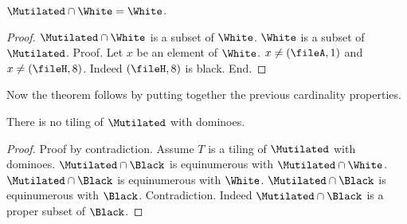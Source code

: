 \begin{forthel}
    \begin{lemma}
        $\Mutilated \cap \White = \White$.
    \end{lemma}
    \begin{proof}
        $\Mutilated \cap \White$ is a subset of $\White$.
        $\White$ is a subset of $\Mutilated$.
        Proof.
            Let $x$ be an element of $\White$.
            $x \neq (\fileA, 1)$ and $x \neq (\fileH,8)$.
            Indeed $(\fileH, 8)$ is black.
        End.
    \end{proof}
\end{forthel}

\noindent Now the theorem follows by putting together the previous cardinality properties.

\begin{forthel}
    \begin{theorem}
        There is no tiling of $\Mutilated$ with dominoes.
    \end{theorem}
    \begin{proof}
        Proof by contradiction.
        Assume $T$ is a tiling of $\Mutilated$ with dominoes.
        $\Mutilated \cap \Black$ is equinumerous with $\Mutilated \cap \White$.
        $\Mutilated \cap \Black$ is equinumerous with $\White$.
        $\Mutilated \cap \Black$ is equinumerous with $\Black$.
        Contradiction. Indeed $\Mutilated \cap \Black$ is a proper subset of $\Black$.
    \end{proof}
\end{forthel}
